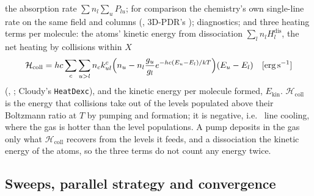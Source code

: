 \begin{enumerate}
  the absorption rate $\sum n_l\sum_uP_{lu}$; for comparison the
  chemistry's own single-line rate on the same field and columns
  (, 3D-PDR's ); diagnostics; and three
  heating terms per molecule: the atoms' kinetic energy from dissociation
  $\sum_l n_l H^{\mathrm{dis}}_l$, the net heating by collisions within $X$
  \begin{equation}
    \mathcal{H}_{\mathrm{coll}} = hc\sum_c\sum_{u>l} n_c k^c_{ul}
       \Bigl(n_u - n_l\frac{g_u}{g_l}e^{-hc(E_u-E_l)/kT}\Bigr)(E_u-E_l)
       \quad[\mathrm{erg\,s^{-1}}]
    \label{eq:hcoll}
  \end{equation}
  (, ; Cloudy's
  \texttt{HeatDexc}), and the kinetic energy per molecule formed,
  $E_{\mathrm{kin}}$. $\mathcal{H}_{\mathrm{coll}}$ is the energy that collisions take out
  of the levels populated above their Boltzmann ratio at $T$ by pumping and
  formation; it is negative, i.e.\ \Htwo{} line cooling, where the gas is
  hotter than the level populations. A pump deposits in the gas only what
  $\mathcal{H}_{\mathrm{coll}}$ recovers from the levels it feeds, and a dissociation
  the kinetic energy of the atoms, so the three terms do not count any
  energy twice.
\end{enumerate}

\subsection{Sweeps, parallel strategy and convergence}
\label{sec:sweeps}

